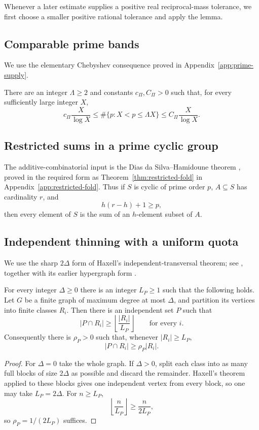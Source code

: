 Whenever a later estimate supplies a positive real reciprocal-mass tolerance, we first choose a smaller positive rational tolerance and apply the lemma.

\subsection{Comparable prime bands}

We use the elementary Chebyshev consequence proved in Appendix~\ref{app:prime-supply}.

\begin{proposition}\label{prop:prime-supply-main}
There are an integer $\Lambda\ge2$ and constants $c_\Pi,C_\Pi>0$ such that, for every sufficiently large integer $X$,
\[
c_\Pi\frac X{\log X}
\le
\#\{p:X<p\le\Lambda X\}
\le
C_\Pi\frac X{\log X}.
\]
\end{proposition}

\subsection{Restricted sums in a prime cyclic group}

The additive-combinatorial input is the Dias da Silva--Hamidoune theorem \cite{DiasDaSilvaHamidoune1994}, proved in the required form as Theorem~\ref{thm:restricted-fold} in Appendix~\ref{app:restricted-fold}.  Thus if $S$ is cyclic of prime order $p$, $A\subseteq S$ has cardinality $r$, and
\[
h(r-h)+1\ge p,
\]
then every element of $S$ is the sum of an $h$-element subset of $A$.

\subsection{Independent thinning with a uniform quota}

We use the sharp $2\Delta$ form of Haxell's independent-transversal theorem; see \cite[Theorem~2]{Haxell2001}, together with its earlier hypergraph form \cite{Haxell1995}.

\begin{proposition}\label{prop:haxell-quota}
For every integer $\Delta\ge0$ there is an integer $L_P\ge1$ such that the following holds.  Let $G$ be a finite graph of maximum degree at most $\Delta$, and partition its vertices into finite classes $R_i$.  Then there is an independent set $P$ such that
\[
|P\cap R_i|\ge \left\lfloor\frac{|R_i|}{L_P}\right\rfloor
\qquad\text{for every }i.
\]
Consequently there is $\rho_P>0$ such that, whenever $|R_i|\ge L_P$,
\[
|P\cap R_i|\ge \rho_P|R_i|.
\]
\end{proposition}

\begin{proof}
For $\Delta=0$ take the whole graph.  If $\Delta>0$, split each class into as many full blocks of size $2\Delta$ as possible and discard the remainder.  Haxell's theorem applied to these blocks gives one independent vertex from every block, so one may take $L_P=2\Delta$.  For $n\ge L_P$,
\[
\left\lfloor\frac n{L_P}\right\rfloor\ge\frac{n}{2L_P},
\]
so $\rho_P=1/(2L_P)$ suffices.
\end{proof}
